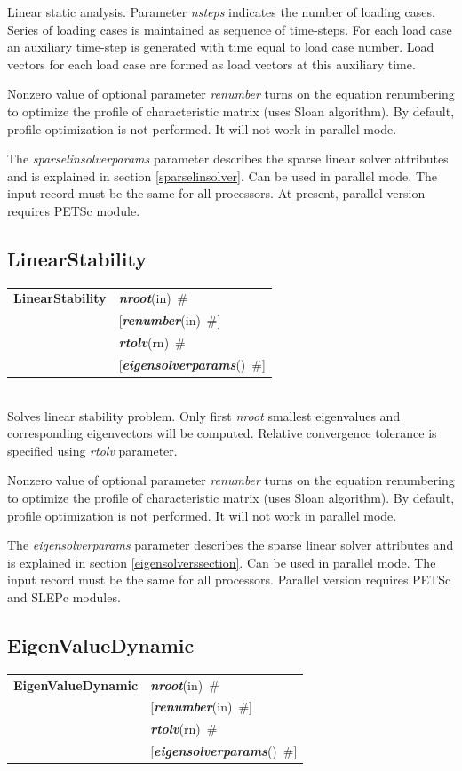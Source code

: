 \documentclass[a4paper]{article}
\makeatletter
\newcommand{\param}[1]{{\em #1}}
\newcommand{\keywordnotype}[1]{\mbox{{\it{\bf{#1}}}}}
\newcommand{\keyword}[2]{\mbox{{\keywordnotype{#1}\tiny (#2)}}}
\newcommand{\entKeywordInst}[1]{\mbox{{\bf{{#1}}}}}
\newcommand{\field}[2]{\mbox{\keyword{#1}{#2}~\#}}
\newcommand{\optField}[2]{\mbox{[\field{#1}{#2}]}}
\newcommand{\Pmode}[1]{{\sffamily #1}}
\newenvironment{record}[1][]{\begin{tabular}{|ll}}{\end{tabular}\\}
\newcommand{\recentry}[2]{{#1}&{#2}\\}
\newcounter{rcc}
\newenvironment{record}[1][\textwidth]{\setcounter{rcc}{0}\begin{tabular*}{#1}{|ll@{\extracolsep{\fill}}r}}{\end{tabular*}\\}
\newcommand{\recentry}[2]{\ifthenelse{\value{rcc}>0}{&$\backslash$ \\}{\setcounter{rcc}{1}}{#1}&{#2}}
\makeatother
\begin{document}
Linear static analysis.
Parameter \param{nsteps} indicates the number of loading cases.
Series of loading cases is maintained as sequence of time-steps.
For each load case an auxiliary time-step is generated with time
equal to load case number.
Load vectors for each load case are formed as load vectors at
this auxiliary time.

Nonzero value of optional parameter \param{renumber} turns on the
equation renumbering to optimize the profile of characteristic matrix
(uses Sloan algorithm). By default, profile optimization is not
performed. It will not work in parallel mode.

The  \param{sparselinsolverparams} parameter describes the sparse
linear solver attributes and is explained in section \ref{sparselinsolver}.
\Pmode{Can be used in parallel mode. The input record must be the same
for all processors. At present, parallel version requires PETSc module.}


\subsection{LinearStability}
\label{LinearStability}
\begin{record}
\recentry{\entKeywordInst{LinearStability}}{\field{nroot}{in}}
\recentry{}{\optField{renumber}{in}}
\recentry{}{\field{rtolv}{rn}} \recentry{}{\optField{eigensolverparams}{}}
\end{record}
Solves linear stability problem. Only first \param{nroot} smallest
eigenvalues and corresponding eigenvectors will be computed.
Relative convergence tolerance is specified using \param{rtolv} parameter.

Nonzero value of optional parameter \param{renumber} turns on the
equation renumbering to optimize the profile of characteristic matrix
(uses Sloan algorithm). By default, profile optimization is not
performed. It will not work in parallel mode.

The \param{eigensolverparams} parameter describes the sparse
linear solver attributes and is explained in section \ref{eigensolverssection}.
\Pmode{Can be used in parallel mode. The input record must be the same
for all processors. Parallel version requires PETSc and SLEPc modules.}

\subsection{EigenValueDynamic}
\label{EigenValueDynamic}
\begin{record}
\recentry{\entKeywordInst{EigenValueDynamic}}{\field{nroot}{in}}
\recentry{}{\optField{renumber}{in}}
\recentry{}{\field{rtolv}{rn}} \recentry{}{\optField{eigensolverparams}{}}
\end{record}
\end{document}

